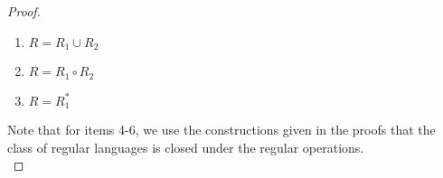 \documentclass[11pt,a4paper]{article}
\begin{document}
\begin{lemma}
\begin{proof}
\begin{enumerate}
 \\
            
            \item $R=R_1\cup R_2$
            \item $R=R_1\circ R_2$
            \item $R=R_1^*$
        \end{enumerate}

        Note that for items 4-6, we use the constructions given in the proofs that the class of regular languages is closed under the regular operations. \\
    \end{proof}
\end{lemma}
\end{document}
